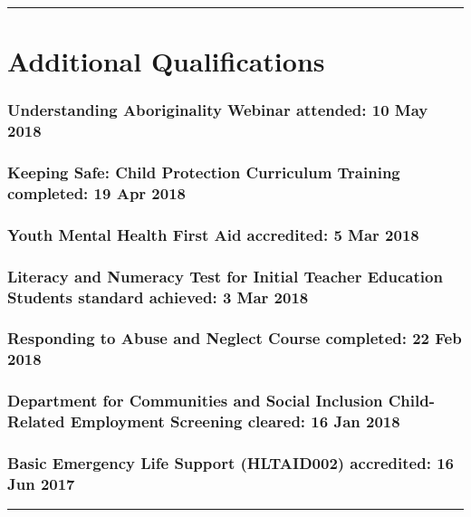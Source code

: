 \documentclass[a4paper,12pt]{report}
\begin{document}
\vspace{0.4cm}
\hrule

\section*{Additional Qualifications}

\subsubsection*{Understanding Aboriginality Webinar \hfill attended: 10 May 2018}

\subsubsection*{Keeping Safe: Child Protection Curriculum Training \hfill completed: 19 Apr 2018}

\subsubsection*{Youth Mental Health First Aid \hfill accredited: 5 Mar 2018}

\subsubsection*{Literacy and Numeracy Test for Initial Teacher Education Students \hfill standard achieved: 3 Mar 2018}

\subsubsection*{Responding to Abuse and Neglect Course \hfill completed: 22 Feb 2018}

\subsubsection*{Department for Communities and Social Inclusion Child-Related Employment Screening \hfill cleared: 16 Jan 2018}

\subsubsection*{Basic Emergency Life Support (HLTAID002) \hfill accredited: 16 Jun 2017}






\vspace{0.4cm}
\hrule
\end{document}
